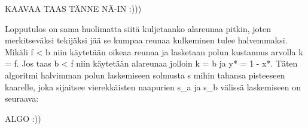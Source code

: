 \documentclass[finnish]{tktltiki2}
\theoremstyle{definition}
\theoremstyle{remark}
\begin{document}
KAAVAA TAAS TÄNNE NÄ-IN :)))

Lopputulos on sama huolimatta siitä kuljetaanko alareunaa pitkin, joten merkitseväksi tekijäksi jää se kumpaa reunaa kulkeminen tulee halvemmaksi. Mikäli f < b niin käytetään oikeaa reunaa ja lasketaan polun kustannus arvolla k = f. Jos taas b < f niin käytetään alareunaa jolloin k = b ja y* = 1 - x*. Täten algoritmi halvimman polun laskemiseen solmusta s mihin tahansa pisteeseen kaarelle, joka sijaitsee vierekkäisten naapurien s_a ja s_b välissä laskemiseen on seuraava:

ALGO :))

%
%
% 
%







% 
\end{document}
